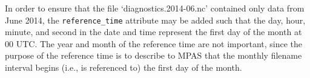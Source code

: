 In order to ensure that the file `diagnostics.2014-06.nc' contained only data from June 2014, the {\tt reference\_time}
attribute may be added such that the day, hour, minute, and second in the date and time represent the first day of the month
at 00 UTC. The year and month of the reference time are not important, since the purpose of the reference time
is to describe to MPAS that the monthly filename interval begins (i.e., is referenced to) the first day of the month.

\vspace{12pt}
 \newline
\hspace*{\mutindent}{\tt type="output"} \newline
\hspace*{\mutindent}{\tt filename\_template="diagnostics.\$Y-\$M.nc"} \newline
\hspace*{\mutindent}{\tt filename\_interval="01-00\_00:00:00"} \newline
\hspace*{\mutindent}{\tt reference\_time="2014-01-01\_00:00:00"} \newline
\hspace*{\mutindent}{\tt precision="single"} \newline
\hspace*{\mutindent}{\tt clobber\_mode="append"} \newline
\hspace*{\mutindent}{\tt output\_interval="6:00:00" />} \newline
\newline
\hspace*{1cm}{\tt <var name="u10"/>} \newline
\hspace*{1cm}{\tt <var name="v10"/>} \newline
\hspace*{1cm}{\tt <var name="t2"/>} \newline
\hspace*{1cm}{\tt <var name="q2"/>} \newline
\newline
{} \newline
\vspace{12pt}


